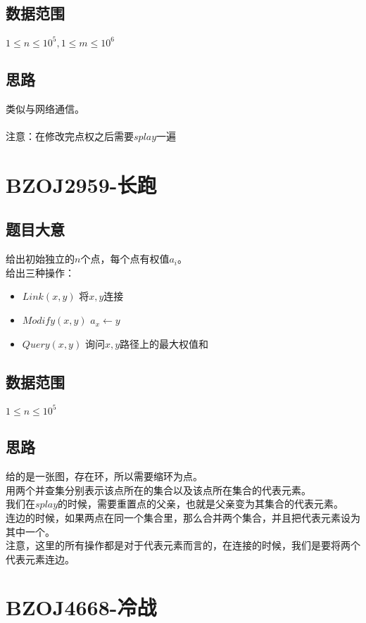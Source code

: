 \documentclass{ctexart}
\numberwithin{equation}{section}
\begin{document}
\begin{flushleft}
  \subsection{数据范围}
  $1\le n\le 10^5, 1\le m \le 10^6$
  \subsection{思路}
  类似与网络通信。\\

  ~\\

  注意：在修改完点权之后需要$splay$一遍\\
  \newpage

  \section{BZOJ2959-长跑}
  \subsection{题目大意}
  给出初始独立的$n$个点，每个点有权值$a_i$。\\
  给出三种操作：\\
  \begin{itemize}
  \item $Link(x,y)$ 将$x,y$连接
  \item $Modify(x,y)$ $a_x \gets y$
  \item $Query(x,y)$ 询问$x,y$路径上的最大权值和
  \end{itemize}
  \subsection{数据范围}
  $1\le n\le 10^5$
  \subsection{思路}
  给的是一张图，存在环，所以需要缩环为点。\\
  用两个并查集分别表示该点所在的集合以及该点所在集合的代表元素。\\
  我们在$splay$的时候，需要重置点的父亲，也就是父亲变为其集合的代表元素。\\
  连边的时候，如果两点在同一个集合里，那么合并两个集合，并且把代表元素设为其中一个。\\
  注意，这里的所有操作都是对于代表元素而言的，在连接的时候，我们是要将两个代表元素连边。\\
  \newpage

  \section{BZOJ4668-冷战}

\end{flushleft}
\end{document}
